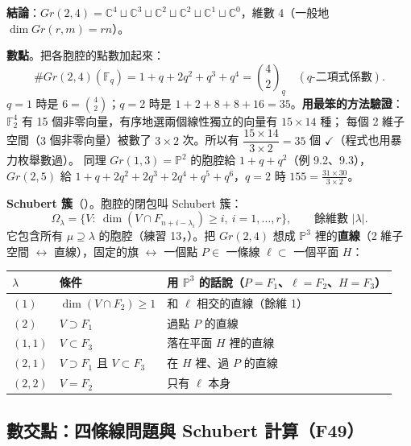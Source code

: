 \begin{table}[H]
\centering
\FulGrassCells
\caption{$Gr(2,4)$ 的六個 Schubert 胞腔 $\Omega^\circ_\lambda$（程式產生）。每個胞腔是 $\mathbb C^{\#\ast}$，星號數 $=4-|\lambda|$。}
\label{tab:f-grasscells}
\end{table}

\textbf{結論}：$Gr(2,4)=\mathbb C^4\sqcup\mathbb C^3\sqcup\mathbb C^2\sqcup\mathbb C^2\sqcup\mathbb C^1\sqcup\mathbb C^0$，維數 4（一般地 $\dim Gr(r,m)=rn$）。

\textbf{數點}。把各胞腔的點數加起來：
\[
\#Gr(2,4)(\mathbb F_q)=1+q+2q^2+q^3+q^4=\binom42_q\quad(\text{$q$-二項式係數}).
\]
$q=1$ 時是 $6=\binom42$；$q=2$ 時是 $1+2+8+8+16=35$。\textbf{用最笨的方法驗證}：$\mathbb F_2^4$ 有 15 個非零向量，有序地選兩個線性獨立的向量有 $15\times14$ 種；
每個 2 維子空間（$3$ 個非零向量）被數了 $3\times2$ 次。所以有 $\dfrac{15\times14}{3\times2}=35$ 個 $\checkmark$（程式也用暴力枚舉數過）。
同理 $Gr(1,3)=\mathbb P^2$ 的胞腔給 $1+q+q^2$（例 9.2、9.3），$Gr(2,5)$ 給 $1+q+2q^2+2q^3+2q^4+q^5+q^6$，$q=2$ 時 $155=\frac{31\times30}{3\times2}$。

\textbf{Schubert 簇}（）。胞腔的閉包叫 Schubert 簇：
\[
\Omega_\lambda=\{V:\ \dim(V\cap F_{n+i-\lambda_i})\ge i,\ i=1,\dots,r\},\qquad \text{餘維數 }|\lambda| .
\]
它包含所有 $\mu\supseteq\lambda$ 的胞腔（練習 13，）。把 $Gr(2,4)$ 想成 $\mathbb P^3$ 裡的\textbf{直線}（2 維子空間 $\leftrightarrow$ 直線），固定的旗 $\leftrightarrow$ 一個點 $P\in$ 一條線 $\ell\subset$ 一個平面 $H$：
\begin{center}
\begin{tabular}{@{}lll@{}}
\toprule
$\lambda$ & 條件 & 用 $\mathbb P^3$ 的話說（$P=F_1$、$\ell=F_2$、$H=F_3$）\\
\midrule
$(1)$ & $\dim(V\cap F_2)\ge1$ & 和 $\ell$ 相交的直線（餘維 1）\\
$(2)$ & $V\supset F_1$ & 過點 $P$ 的直線\\
$(1,1)$ & $V\subset F_3$ & 落在平面 $H$ 裡的直線\\
$(2,1)$ & $V\supset F_1$ 且 $V\subset F_3$ & 在 $H$ 裡、過 $P$ 的直線\\
$(2,2)$ & $V=F_2$ & 只有 $\ell$ 本身\\
\bottomrule
\end{tabular}
\end{center}

\subsection{數交點：四條線問題與 Schubert 計算（F49）}\label{sec:f-fourlines}

